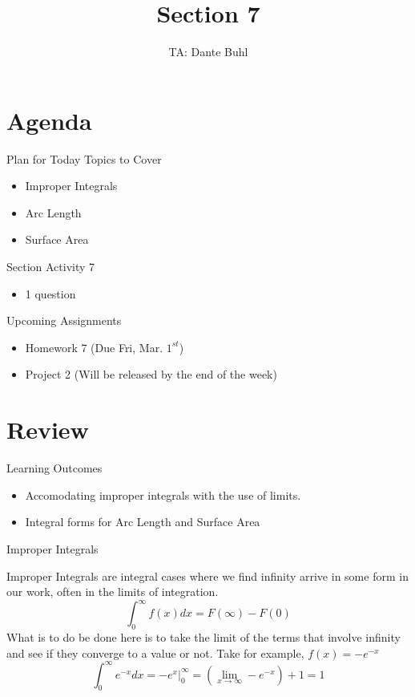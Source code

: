 \documentclass{beamer}
\title{Section 7}
\author{TA: Dante Buhl}
\institute{UCSC Math-19B}
\begin{document}
\newcommand{\bmp}[1]{\begin{minipage}{#1\textwidth}}
\newcommand{\emp}{\end{minipage}}


\frame{\titlepage}

\section{Agenda}
\begin{frame}{Plan for Today}
    Topics to Cover
    \begin{itemize}
        \item Improper Integrals
        \item Arc Length
        \item Surface Area
    \end{itemize}
    Section Activity 7
    \begin{itemize}
        \item 1 question
    \end{itemize}
    Upcoming Assignments
    \begin{itemize}
        \item Homework 7 (Due Fri, Mar. $1^{st}$)
        \item Project 2 (Will be released by the end of the week)
    \end{itemize}
\end{frame}


\section{Review}
\begin{frame}{Learning Outcomes}
    \begin{itemize}
        \item Accomodating improper integrals with the use of limits. 
        \item Integral forms for Arc Length and Surface Area
    \end{itemize}
\end{frame}

\begin{frame}{Improper Integrals}

Improper Integrals are integral cases where we find infinity arrive in some form in our work, often in the limits of integration.
\[
    \int_0^{\infty} f(x) dx = F(\infty) - F(0)
\]
What is to do be done here is to take the limit of the terms that involve infinity and see if they converge to a value or not. Take for example, $f(x) = -e^{-x}$
\[
    \int_0^{\infty} e^{-x}dx = -e^{x}\Big|_0^{\infty} = \left(\lim_{x\to \infty} -e^{-x}\right) + 1 = 1
\]


\end{frame}
\end{document}
